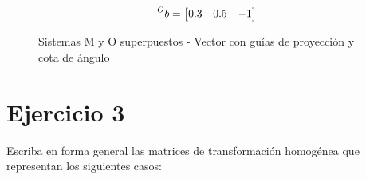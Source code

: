 \documentclass[a4paper,12pt]{article}
\begin{document}
\begin{equation*}
    \prescript{O}{}{b} = 
    \begin{bmatrix}
        0.3 & 0.5 & -1
    \end{bmatrix}
\end{equation*}

\begin{figure}[H]
    \centering
    \begin{adjustbox}{scale = 0.85, max width=\columnwidth}
    \end{adjustbox}
    \caption{Sistemas M y O superpuestos - Vector con guías de proyección y cota de ángulo}
\end{figure}

\section{Ejercicio 3}
Escriba en forma general las matrices de transformación homogénea que
representan los siguientes casos:
\end{document}
